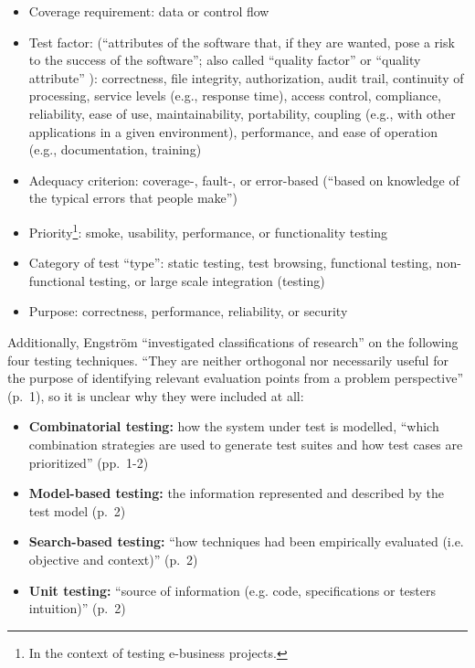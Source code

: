 \begin{itemize}
          \citep[p.~214]{KuļešovsEtAl2013}
    \item Coverage requirement: data or control flow \citep[pp.~4-5]{Kam2008}
    \item Test factor: (``attributes of the software that, if they are wanted,
          pose a risk to the success of the software''; also called ``quality
          factor'' or ``quality attribute'' \citep[p.~40]{Perry2006}):
          correctness, file integrity, authorization, audit trail, continuity
          of processing, service levels (e.g., response time), access control,
          compliance, reliability, ease of use, maintainability, portability,
          coupling (e.g., with other applications in a given environment),
          performance, and ease of operation (e.g., documentation, training)
          \citep[pp.~40-41]{Perry2006}
    \item Adequacy criterion: coverage-, fault-, or error-based
          (``based on knowledge of the typical errors that people make'')
          \citep[pp.~398-399]{vanVliet2000}
    \item Priority\footnote{In the context of testing e-business projects.}:
          smoke, usability, performance, or functionality testing
          \citep[p.~12]{Gerrard2000a}
    \item Category of test ``type'': static testing,
          test browsing, functional testing, non-functional testing, or large
          scale integration (testing) \citep[p.~12]{Gerrard2000a}
    \item Purpose: correctness, performance, reliability, or security
          \citep{Pan1999}
\end{itemize}

Additionally, Engström ``investigated classifications of research''
\citep[p.~1]{engström_mapping_2015} on the following four testing techniques.
``They are neither orthogonal nor necessarily useful for the purpose of
identifying relevant evaluation points from a problem perspective'' (p.~1), so
it is unclear why they were included at all:

\begin{itemize}
    \item \textbf{Combinatorial testing:} how the system under test is
          modelled, ``which combination strategies are used to generate test
          suites and how test cases are prioritized'' (pp.~1-2)
    \item \textbf{Model-based testing:} the information represented and
          described by the test model (p.~2)
    \item \textbf{Search-based testing:} ``how techniques%
           had been empirically evaluated
          (i.e. objective and context)'' (p.~2)
    \item \textbf{Unit testing:} ``source of information (e.g. code,
          specifications or testers intuition)'' (p.~2)
\end{itemize}
\fi

